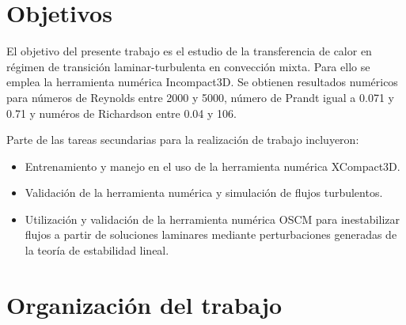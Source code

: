 \section{Objetivos}

El objetivo del presente trabajo es el estudio de la transferencia de calor en régimen de transición laminar-turbulenta en convección mixta. Para ello se emplea la herramienta numérica Incompact3D. Se obtienen resultados numéricos para números de Reynolds entre 2000 y 5000, número de Prandt igual a 0.071 y 0.71 y numéros de Richardson entre 0.04 y 106.

Parte de las tareas secundarias para la realización de trabajo incluyeron:

\begin{itemize}

	\item Entrenamiento y manejo en el uso de la herramienta numérica XCompact3D.
	
	\item Validación de la herramienta numérica y simulación de flujos turbulentos.

	\item Utilización y validación de la herramienta numérica OSCM \cite{szuban2023} para inestabilizar flujos a partir de soluciones laminares mediante perturbaciones generadas de la teoría de estabilidad lineal.

\end{itemize}

\section{Organización del trabajo}



